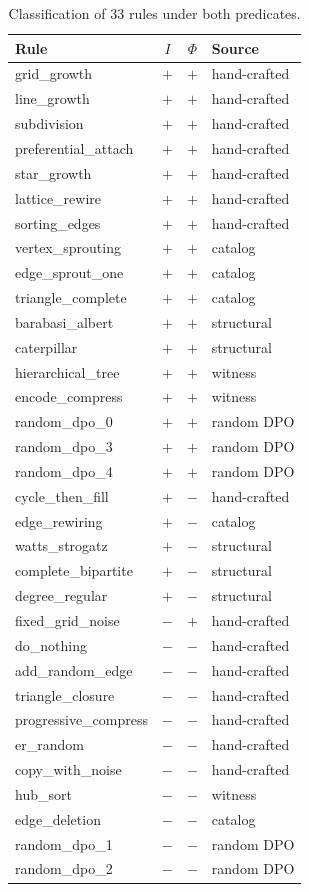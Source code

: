 \documentclass{../shared/primo}
\begin{document}
\begin{table}[ht]
\centering
\small
\begin{tabular}{lccl}
\toprule
Rule & $I$ & $\Phi$ & Source \\
\midrule
grid\_growth & $+$ & $+$ & hand-crafted \\
line\_growth & $+$ & $+$ & hand-crafted \\
subdivision & $+$ & $+$ & hand-crafted \\
preferential\_attach & $+$ & $+$ & hand-crafted \\
star\_growth & $+$ & $+$ & hand-crafted \\
lattice\_rewire & $+$ & $+$ & hand-crafted \\
sorting\_edges & $+$ & $+$ & hand-crafted \\
vertex\_sprouting & $+$ & $+$ & catalog \\
edge\_sprout\_one & $+$ & $+$ & catalog \\
triangle\_complete & $+$ & $+$ & catalog \\
barabasi\_albert & $+$ & $+$ & structural \\
caterpillar & $+$ & $+$ & structural \\
hierarchical\_tree & $+$ & $+$ & witness \\
encode\_compress & $+$ & $+$ & witness \\
random\_dpo\_0 & $+$ & $+$ & random DPO \\
random\_dpo\_3 & $+$ & $+$ & random DPO \\
random\_dpo\_4 & $+$ & $+$ & random DPO \\
\midrule
cycle\_then\_fill & $+$ & $-$ & hand-crafted \\
edge\_rewiring & $+$ & $-$ & catalog \\
watts\_strogatz & $+$ & $-$ & structural \\
complete\_bipartite & $+$ & $-$ & structural \\
degree\_regular & $+$ & $-$ & structural \\
\midrule
fixed\_grid\_noise & $-$ & $+$ & hand-crafted \\
\midrule
do\_nothing & $-$ & $-$ & hand-crafted \\
add\_random\_edge & $-$ & $-$ & hand-crafted \\
triangle\_closure & $-$ & $-$ & hand-crafted \\
progressive\_compress & $-$ & $-$ & hand-crafted \\
er\_random & $-$ & $-$ & hand-crafted \\
copy\_with\_noise & $-$ & $-$ & hand-crafted \\
hub\_sort & $-$ & $-$ & witness \\
edge\_deletion & $-$ & $-$ & catalog \\
random\_dpo\_1 & $-$ & $-$ & random DPO \\
random\_dpo\_2 & $-$ & $-$ & random DPO \\
\bottomrule
\end{tabular}
\caption{Classification of 33 rules under both predicates.}
\label{tab:results}
\end{table}
\end{document}
